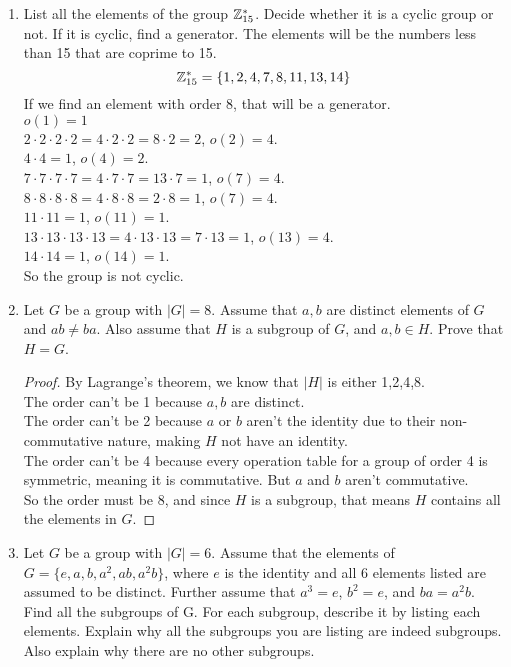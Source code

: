 \documentclass[12pt]{article}
\begin{document}
	\begin{enumerate}
		\item List all the elements of the group $\mathbb{Z}^*_{15}$. Decide whether it is a cyclic group or not. If it is cyclic, find a generator.\m
		The elements will be the numbers less than 15 that are coprime to 15. $$\mathbb{Z}^*_{15} = \{1,2,4,7,8,11,13,14\}$$
		If we find an element with order 8, that will be a generator.\\
		$o(1) = 1$\\
		$2\cdot2\cdot2\cdot2 = 4\cdot2\cdot2 = 8\cdot2 = 2$, $o(2) = 4$.\\
		$4\cdot4 = 1$, $o(4) = 2$.\\
		$7\cdot7\cdot7\cdot7 = 4\cdot7\cdot7 = 13\cdot7 = 1$, $o(7) = 4$.\\
		$8\cdot8\cdot8\cdot8 = 4\cdot8\cdot8 = 2\cdot8 = 1$, $o(7) = 4$.\\
		$11\cdot11 = 1$, $o(11) = 1$.\\
		$13\cdot13\cdot13\cdot13 = 4\cdot13\cdot13 = 7\cdot13 = 1$, $o(13) = 4$.\\
		$14\cdot14 = 1$, $o(14) = 1$.\\
		So the group is not cyclic.
		\item Let $G$ be a group with $|G| = 8$. Assume that $a, b$ are distinct elements of $G$ and $ab \neq ba$. Also assume that $H$ is a subgroup of $G$, and $a, b \in H$. Prove that $H = G$.
		\begin{proof}
			By Lagrange's theorem, we know that $|H|$ is either 1,2,4,8.\\
			The order can't be 1 because $a,b$ are distinct.\\
			The order can't be 2 because $a$ or $b$ aren't the identity due to their non-commutative nature, making $H$ not have an identity.\\
			The order can't be 4 because every operation table for a group of order 4 is symmetric, meaning it is commutative. But $a$ and $b$ aren't commutative.\\
			So the order must be 8, and since $H$ is a subgroup, that means $H$ contains all the elements in $G$.
		\end{proof}
		
		\item Let $G$ be a group with $|G| = 6$. Assume that the elements of $G = \{e, a, b, a^2, ab, a^2b\}$, where $e$ is the identity and all 6 elements listed are assumed to be distinct. Further assume that $a^3 = e$, $b^2 = e$, and $ba = a^2b$.\\
		Find all the subgroups of G. For each subgroup, describe it by listing each elements. Explain why all the subgroups you are listing are indeed subgroups. Also explain why there are no other subgroups.
		

\end{enumerate}
\end{document}

